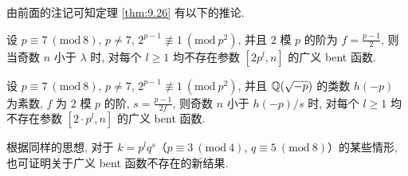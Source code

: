 由前面的注记可知定理 \ref{thm:9.26} 有以下的推论.

\begin{corollary}[1]
设 $p\equiv 7\ (\mathrm{mod}\ 8)$, $p\neq 7$, $2^{p-1}\not\equiv 1\ (\mathrm{mod}\ p^2)$, 并且 $2$ 模 $p$ 的阶为 $f=\frac{p-1}{2}$, 则当奇数 $n$ 小于 $\lambda$ 时, 对每个 $l\geqslant 1$ 均不存在参数 $[2p^l,n]$ 的广义 bent 函数.
\end{corollary}

\begin{corollary}[2]
设 $p\equiv 7\ (\mathrm{mod}\ 8)$, $p\neq 7$, $2^{p-1}\not\equiv 1\ (\mathrm{mod}\ p^2)$, 并且 $\mathbb{Q}(\sqrt{-p})$ 的类数 $h(-p)$ 为素数, $f$ 为 $2$ 模 $p$ 的阶, $s=\frac{p-1}{2f}$, 则奇数 $n$ 小于 $h(-p)/s$ 时, 对每个 $l\geqslant 1$ 均不存在参数 $[2\cdot p^l,n]$ 的广义 bent 函数.
\end{corollary}

根据同样的思想, 对于 $k=p^lq^s$（$p\equiv 3\ (\mathrm{mod}\ 4)$, $q\equiv 5\ (\mathrm{mod}\ 8)$）的某些情形, 也可证明关于广义 bent 函数不存在的新结果.
